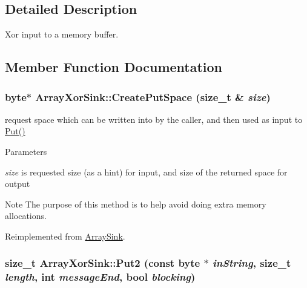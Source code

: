 \subsection{Detailed Description}
Xor input to a memory buffer. 

\subsection{Member Function Documentation}
\hypertarget{class_array_xor_sink_a39567ce27137cc06ed9a2b0a1c834f01}{
\subsubsection[{CreatePutSpace}]{\setlength{\rightskip}{0pt plus 5cm}byte$\ast$ ArrayXorSink::CreatePutSpace (size\_\-t \& {\em size})}}
\label{class_array_xor_sink_a39567ce27137cc06ed9a2b0a1c834f01}


request space which can be written into by the caller, and then used as input to \hyperlink{class_buffered_transformation_ae70658b0d271f8e114ac6c3cc9774ede}{Put()} 
\begin{DoxyParams}{Parameters}
\item[{\em size}]is requested size (as a hint) for input, and size of the returned space for output\end{DoxyParams}
\begin{DoxyNote}{Note}
The purpose of this method is to help avoid doing extra memory allocations. 
\end{DoxyNote}


Reimplemented from \hyperlink{class_array_sink_a10b95ee17a2b7763757b021de0172f5f}{ArraySink}.\hypertarget{class_array_xor_sink_adc9d43ea392d62c8e87f29702085da3e}{
\subsubsection[{Put2}]{\setlength{\rightskip}{0pt plus 5cm}size\_\-t ArrayXorSink::Put2 (const byte $\ast$ {\em inString}, \/  size\_\-t {\em length}, \/  int {\em messageEnd}, \/  bool {\em blocking})}}
\label{class_array_xor_sink_adc9d43ea392d62c8e87f29702085da3e}


